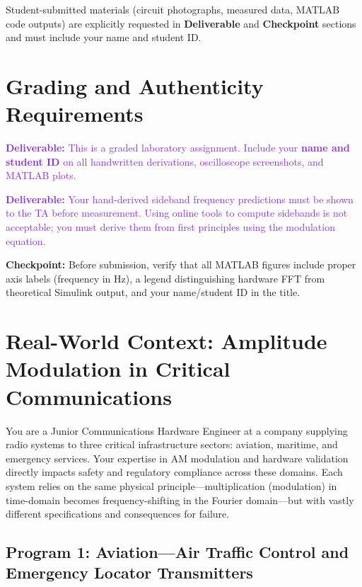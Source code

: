 \documentclass[11pt,letterpaper]{article}
\providecommand{\cpECE}[1]{\textcolor{OliveGreen}{\textbf{Checkpoint:} #1}}
\providecommand{\delECE}[1]{\textcolor{BlueViolet}{\textbf{Deliverable:} #1}}
\begin{document}
\noindent Student-submitted materials (circuit photographs, measured data, MATLAB code outputs) are explicitly requested in \textbf{Deliverable} and \textbf{Checkpoint} sections and must include your name and student ID.

\clearpage

\section*{Grading and Authenticity Requirements}
\delECE{This is a graded laboratory assignment. Include your \textbf{name and student ID} on all handwritten derivations, oscilloscope screenshots, and MATLAB plots.}

\delECE{Your hand-derived sideband frequency predictions must be shown to the TA before measurement. Using online tools to compute sidebands is not acceptable; you must derive them from first principles using the modulation equation.}

\cpECE{Before submission, verify that all MATLAB figures include proper axis labels (frequency in Hz), a legend distinguishing hardware FFT from theoretical Simulink output, and your name/student ID in the title.}

\clearpage

\section{Real-World Context: Amplitude Modulation in Critical Communications}

\noindent
You are a Junior Communications Hardware Engineer at a company supplying radio systems to three critical infrastructure sectors: aviation, maritime, and emergency services. Your expertise in AM modulation and hardware validation directly impacts safety and regulatory compliance across these domains. Each system relies on the same physical principle—multiplication (modulation) in time-domain becomes frequency-shifting in the Fourier domain—but with vastly different specifications and consequences for failure.

\subsection{Program 1: Aviation—Air Traffic Control and Emergency Locator Transmitters}
\end{document}
